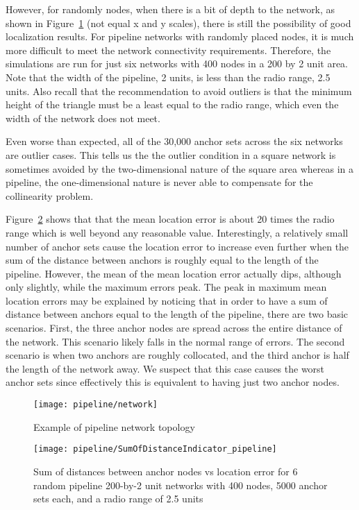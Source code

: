 However, for randomly nodes, when there is a bit of depth to the network, as shown in Figure~\ref{fig:pipeline} (not equal x and y scales), there is still the possibility of good localization results.  For pipeline networks with randomly placed nodes, it is much more difficult to meet the network connectivity requirements.  Therefore, the simulations are run for just six networks with 400 nodes in a 200 by 2 unit area.  Note that the width of the pipeline, 2 units, is less than the radio range, 2.5 units.  Also recall that the recommendation to avoid outliers is that the minimum height of the triangle must be a least equal to the radio range, which even the width of the network does not meet. 

Even worse than expected, all of the 30,000 anchor sets across the six networks are outlier cases.  This tells us the the outlier condition in a square network is sometimes avoided by the two-dimensional nature of the square area whereas in a pipeline, the one-dimensional nature is never able to compensate for the collinearity problem.

Figure~\ref{fig:pipelineindicator} shows that that the mean location error is about 20 times the radio range which is well beyond any reasonable value. Interestingly, a relatively small number of anchor sets cause the location error to increase even further when the sum of the distance between anchors is roughly equal to the length of the pipeline.  However, the mean of the mean location error actually dips, although only slightly, while the maximum errors peak.  The peak in maximum mean location errors may be explained by noticing that in order to have a sum of distance between anchors equal to the length of the pipeline, there are two basic scenarios.  First, the three anchor nodes are spread across the entire distance of the network.  This scenario likely falls in the normal range of errors.  The second scenario is when two anchors are roughly collocated, and the third anchor is half the length of the network away.  We suspect that this case causes the worst anchor sets since effectively this is equivalent to having just two anchor nodes.

\begin{figure}
  \centering
	\texttt{[image: pipeline/network]}
	\caption{Example of pipeline network topology}
	\label{fig:pipeline}
\end{figure}

\begin{figure}
  \centering
	\texttt{[image: pipeline/SumOfDistanceIndicator\_pipeline]}
	\caption[Sum of distances between anchor nodes vs location error in a pipeline topology]{Sum of distances between anchor nodes vs location error for 6 random pipeline 200-by-2 unit networks with 400 nodes, 5000 anchor sets each, and a radio range of 2.5 units}
	\label{fig:pipelineindicator}
\end{figure}

